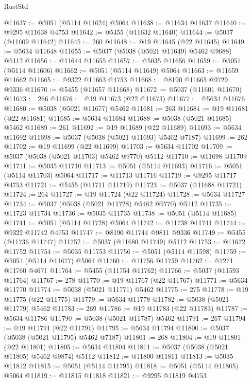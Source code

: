 \begin{lexlean}{RustStd}
\begin{coremodule}
@11637 := @5051 (@5114 @11624) @5064
@11638 := @11634 @11637
@11640 := @9295 @11638 @4753
@11642 := @5455 (@11632 @11640)
@11644 := @5037 (@11609 @11642)
@11645 := 260
@11648 := @19 @11645 (@22 @11645)
@11649 := @5634 @11648
@11655 := @5037 (@5038 (@5021 @11649) @5462 @9688) @5112
@11656 := @11644 @11655
@11657 := @5035 @11656
@11659 := @5051 (@5114 @11606)
@11662 := @5051 (@5114 @11649) @5064
@11663 := @11659 @11662
@11665 := @9322 @11663 @4753
@11668 := @8190 @11665 @9729 @9336
@11670 := @5455 (@11657 @11668)
@11672 := @5037 (@11601 @11670)
@11673 := 266
@11676 := @19 @11673 (@22 @11673)
@11677 := @5634 @11676
@11680 := @5038 (@5021 @11677) @5462
@11681 := 263
@11684 := @19 @11681 (@22 @11681)
@11685 := @5634 @11684
@11688 := @5038 (@5021 @11685) @5462
@11689 := 261
@11692 := @19 @11689 (@22 @11689)
@11693 := @5634 @11692
@11698 := @5037 (@5038 (@5021 @11693) @5462 @7187)
@11699 := 262
@11702 := @19 @11699 (@22 @11699)
@11703 := @5634 @11702
@11709 := @5037 (@5038 (@5021 @11703) @5462 @9770) @5112
@11710 := @11698 @11709
@11711 := @5035 @11710
@11713 := @5051 (@5114 @11693)
@11716 := @5051 (@5114 @11703) @5064
@11717 := @11713 @11716
@11719 := @9295 @11717 @4753
@11721 := @5455 (@11711 @11719)
@11723 := @5037 (@11688 @11721)
@11724 := 264
@11727 := @19 @11724 (@22 @11724)
@11728 := @5634 @11727
@11734 := @5037 (@5038 (@5021 @11728) @5462 @9770) @5112
@11735 := @11723 @11734
@11736 := @5035 @11735
@11738 := @5051 (@5114 @11685)
@11741 := @5051 (@5114 @11728) @5064
@11742 := @11738 @11741
@11744 := @9322 @11742 @4753
@11747 := @8190 @11744 @9811 @9336
@11749 := @5455 (@11736 @11747)
@11752 := @5037 (@11680 @11749) @5112
@11753 := @11672 @11752
@11754 := @5035 @11753
@11756 := @5051 (@5114 @11598)
@11759 := @5051 (@5114 @11677) @5064
@11760 := @11756 @11759
@11762 := @7271 @11760 @4671
@11764 := @5455 (@11754 @11762)
@11766 := @5037 (@11593 @11764)
@11767 := 278
@11770 := @19 @11767 (@22 @11767)
@11771 := @5634 @11770
@11774 := @5038 (@5021 @11771) @5462
@11775 := 275
@11778 := @19 @11775 (@22 @11775)
@11779 := @5634 @11778
@11782 := @5038 (@5021 @11779) @5462
@11783 := 269
@11786 := @19 @11783 (@22 @11783)
@11787 := @5634 @11786
@11790 := @5038 (@5021 @11787) @5462
@11791 := 267
@11794 := @19 @11791 (@22 @11791)
@11795 := @5634 @11794
@11800 := @5037 (@5038 (@5021 @11795) @5462 @7187)
@11801 := 268
@11804 := @19 @11801 (@22 @11801)
@11805 := @5634 @11804
@11811 := @5037 (@5038 (@5021 @11805) @5462 @9874) @5112
@11812 := @11800 @11811
@11813 := @5035 @11812
@11815 := @5051 (@5114 @11795)
@11818 := @5051 (@5114 @11805) @5064
@11819 := @11815 @11818
@11821 := @9295 @11819 @4753

\end{coremodule}
\end{lexlean}
